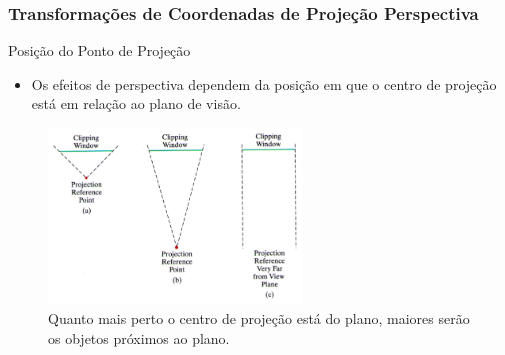 \documentclass{beamer}
\begin{document}
\begin{frame}
\frametitle{Transformações de Coordenadas de Projeção Perspectiva}
	\begin{block}{Posição do Ponto de Projeção}
		\begin{itemize}
			\item Os efeitos de perspectiva dependem da posição em que o centro de projeção está em relação ao plano de visão.
		\end{itemize}	
	\end{block}
	
	\begin{figure}[!h]
			\begin{center}
			\includegraphics[width=0.6\textwidth]{Figures/PonProPos2}
			\caption{Quanto mais perto o centro de projeção está do plano, maiores serão os objetos próximos ao plano.}
			\end{center}
	\end{figure}
\end{frame}
\end{document}
